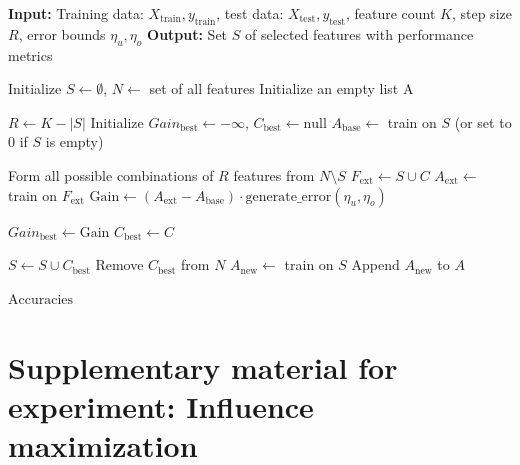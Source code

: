 \begin{algorithm}[ht!]
\caption{R-Step Predictive Greedy Feature Selection} \label{algo:r-step-predictive-greedy}
\begin{algorithmic}[1]
\State \textbf{Input:} Training data: \( X_{\text{train}}, y_{\text{train}} \), test data: \( X_{\text{test}}, y_{\text{test}} \), feature count \( K \), step size \( R \), error bounds \( \eta_u, \eta_o \)
\State \textbf{Output:} Set \( S \) of selected features with performance metrics

\State Initialize \( S \gets \emptyset \), \( N \gets \) set of all features
\State Initialize an empty list \( \text{A} \)

        \State \( R \gets K - |S| \) 
    \EndIf
    \State Initialize \( Gain_\text{best} \gets -\infty \), \( C_\text{best} \gets \text{null} \)
    \State \( A_\text{base} \gets \) train on \( S \) (or set to 0 if \( S \) is empty)
    
    \State Form all possible combinations of \( R \) features from \( N \setminus S \)
        \State \( F_\text{ext} \gets S \cup C \)
        \State \( A_\text{ext} \gets \) train on \( F_\text{ext} \)
        \State \( \text{Gain} \gets (A_\text{ext} - A_\text{base}) \cdot \text{generate\_error}(\eta_u, \eta_o) \)
        
            \State \( Gain_\text{best} \gets \text{Gain} \)
            \State \( C_\text{best} \gets C \)
        \EndIf
    \EndFor
    
    \State \( S \gets S \cup  C_\text{best} \)
    \State Remove \(  C_\text{best} \) from \( N \)
    \State \( A_\text{new} \gets \) train on \( S \)
    \State Append \( A_\text{new} \) to \( A \)
\EndWhile

\State \Return \( \text{Accuracies} \)
\end{algorithmic}
\end{algorithm}


\clearpage
\section{Supplementary material for experiment: Influence maximization} \label{appendix:supp-material-application2}

